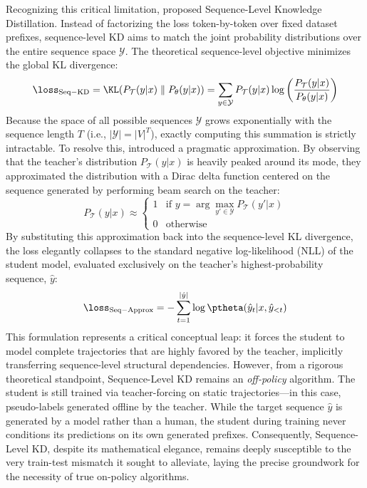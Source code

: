 Recognizing this critical limitation, \citet{kim2016sequence} proposed Sequence-Level Knowledge Distillation. Instead of factorizing the loss token-by-token over fixed dataset prefixes, sequence-level KD aims to match the joint probability distributions over the entire sequence space $\mathcal{Y}$. The theoretical sequence-level objective minimizes the global KL divergence:
\begin{equation}
    \loss_{\mathrm{Seq-KD}} = \KL(P_{\mathcal{T}}(y | x) \parallel P_{\theta}(y | x)) = \sum_{y \in \mathcal{Y}} P_{\mathcal{T}}(y | x) \log \left( \frac{P_{\mathcal{T}}(y | x)}{P_{\theta}(y | x)} \right)
\end{equation}
Because the space of all possible sequences $\mathcal{Y}$ grows exponentially with the sequence length $T$ (i.e., $|\mathcal{Y}| = |V|^T$), exactly computing this summation is strictly intractable. To resolve this, \citet{kim2016sequence} introduced a pragmatic approximation. By observing that the teacher's distribution $P_{\mathcal{T}}(y|x)$ is heavily peaked around its mode, they approximated the distribution with a Dirac delta function centered on the sequence generated by performing beam search on the teacher:
\begin{equation}
    P_{\mathcal{T}}(y | x) \approx \begin{cases} 
      1 & \text{if } y = \arg\max_{y' \in \mathcal{Y}} P_{\mathcal{T}}(y' | x) \\
      0 & \text{otherwise} 
   \end{cases}
\end{equation}
By substituting this approximation back into the sequence-level KL divergence, the loss elegantly collapses to the standard negative log-likelihood (NLL) of the student model, evaluated exclusively on the teacher's highest-probability sequence, $\hat{y}$:
\begin{equation}
    \loss_{\mathrm{Seq-Approx}} = - \sum_{t=1}^{|\hat{y}|} \log \ptheta(\hat{y}_t | x, \hat{y}_{<t})
\end{equation}
This formulation represents a critical conceptual leap: it forces the student to model complete trajectories that are highly favored by the teacher, implicitly transferring sequence-level structural dependencies. However, from a rigorous theoretical standpoint, Sequence-Level KD remains an \textit{off-policy} algorithm. The student is still trained via teacher-forcing on static trajectories—in this case, pseudo-labels generated offline by the teacher. While the target sequence $\hat{y}$ is generated by a model rather than a human, the student during training never conditions its predictions on its own generated prefixes. Consequently, Sequence-Level KD, despite its mathematical elegance, remains deeply susceptible to the very train-test mismatch it sought to alleviate, laying the precise groundwork for the necessity of true on-policy algorithms.

